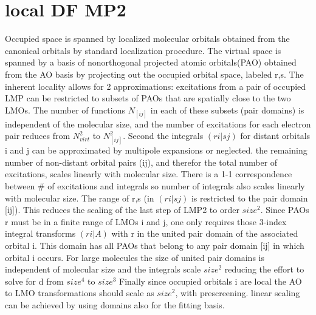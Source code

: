 \documentclass[10pt, draft]{article}
\begin{document}
	\section{local DF MP2}
	
	Occupied space is spanned by localized molecular orbitals obtained from the canonical orbitals by standard localization procedure. The virtual space is spanned by a basis of nonorthogonal projected atomic orbitals(PAO) obtained from the AO basis by projecting out the occupied orbital space, labeled r,s.  The inherent locality allows for 2 approximations: excitations from a pair of occupied LMP can be restricted to subsets of PAOs that are spatially close to the two LMOs.  The number of functions $N_{[ij]}$ in each of these subsets (pair domains) is independent of the molecular size, and the number of excitations for each electron pair reduces from $N_{virt}^2$ to $N_{[ij]}^2$.  Second the integrals $(ri|sj)$ for distant orbitals i and j can be approximated by multipole expansions or neglected.  the remaining number of non-distant orbital pairs (ij), and therefor the total number of excitations, scales linearly with molecular size.  There is a 1-1 correspondence between \# of excitations and integrals so number of integrals also scales linearly with molecular size.  The range of r,s (in $(ri|sj)$ is restricted to the pair domain [ij]). \linebreak[1]
	This reduces the scaling of the last step of LMP2 to order $size^2$. Since PAOs r must be in a finite range of LMOs i and j, one only requires those 3-index integral transforms $(ri|A)$ with r in the united pair domain of the associated orbital i.  This domain has all PAOs that belong to any pair domain [ij] in which orbital i occurs.  For large molecules the size of united pair domains is independent of molecular size and the integrals scale $size^2$ reducing the effort to solve for d from $size^4$ to $size^3$ Finally since occupied orbitals i are local the AO to LMO transformations should scale as $size^2$, with prescreening.  linear scaling can be achieved by using domains also for the fitting basis. \linebreak[1]
	
\end{document}
